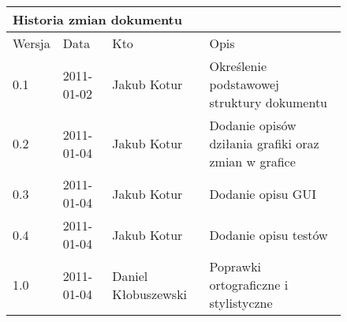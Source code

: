 \begin{figure}[h]
	\centering

\begin{tabular}{|p{}|p{}|p{}|p{}|}
	\hline
	\multicolumn{4}{|l|}{Historia zmian dokumentu} \\
	\hline
	Wersja & Data & Kto & Opis \\
	\hline
	0.1 & 2011-01-02 & Jakub Kotur &
	Określenie podstawowej struktury dokumentu \\
	\hline
	0.2 & 2011-01-04 & Jakub Kotur &
	Dodanie opisów dziłania grafiki oraz zmian w grafice \\
	\hline
	0.3 & 2011-01-04 & Jakub Kotur &
	Dodanie opisu GUI \\
	\hline
	0.4 & 2011-01-04 & Jakub Kotur &
	Dodanie opisu testów \\
	\hline
	1.0 & 2011-01-04 & Daniel Kłobuszewski &
	Poprawki ortograficzne i stylistyczne \\
	\hline
\end{tabular}

	\label{tab:hist}
\end{figure}

